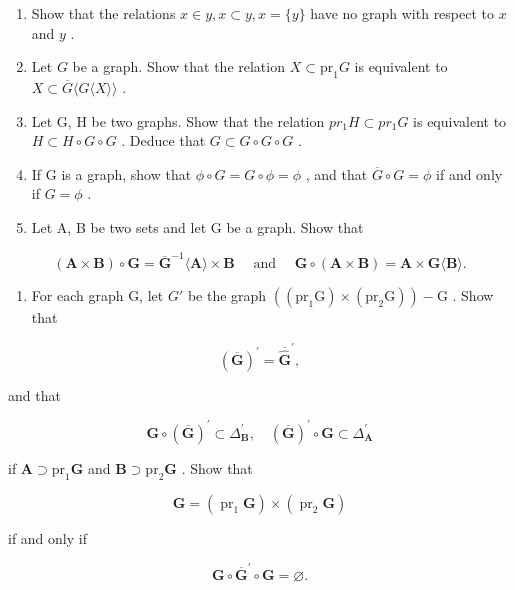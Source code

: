 \begin{enumerate}
\def\labelenumi{\arabic{enumi}.}
\item
  Show that the relations \(x \in y, x \subset y, x = \{y\}\) have no graph with respect to \(x\) and \(y\) .
\item
  Let \(G\) be a graph. Show that the relation \(X \subset \mathrm{pr}_1 G\) is equivalent to \(X \subset \overline{G} \langle G \langle X \rangle \rangle\) .
\item
  Let G, H be two graphs. Show that the relation \(pr_{1}H \subset pr_{1}G\) is equivalent to \(H \subset H \circ G \circ G\) . Deduce that \(G \subset G \circ G \circ G\) .
\item
  If G is a graph, show that \(\phi \circ G = G \circ \phi = \phi\) , and that \(\overline{G} \circ G = \phi\) if and only if \(G = \phi\) .
\item
  Let A, B be two sets and let G be a graph. Show that
\end{enumerate}

\[
(\mathbf {A} \times \mathbf {B}) \circ \mathbf {G} = \overline {{\mathbf {G}}} ^ {- 1} \langle \mathbf {A} \rangle \times \mathbf {B} \quad \text { and } \quad \mathbf {G} \circ (\mathbf {A} \times \mathbf {B}) = \mathbf {A} \times \mathbf {G} \langle \mathbf {B} \rangle .
\]

\begin{enumerate}
\def\labelenumi{\arabic{enumi}.}
\setcounter{enumi}{5}
\tightlist
\item
  For each graph G, let \(G'\) be the graph \(((\mathrm{pr}_{1}\mathrm{G}) \times (\mathrm{pr}_{2}\mathrm{G})) - \mathrm{G}\) . Show that
\end{enumerate}

\[
(\overline {{\mathbf {G}}}) ^ {\prime} = \overline {{\widehat {\mathbf {G}}}} ^ {\prime},
\]

and that

\[
\mathbf {G} \circ (\overline {{\mathbf {G}}}) ^ {\prime} \subset \Delta_ {\mathbf {B}} ^ {\prime}, \quad (\overline {{\mathbf {G}}}) ^ {\prime} \circ \mathbf {G} \subset \Delta_ {\mathbf {A}} ^ {\prime}
\]

if \(\mathbf{A} \supset \mathrm{pr}_1\mathbf{G}\) and \(\mathbf{B} \supset \mathrm{pr}_2\mathbf{G}\) . Show that

\[
\mathbf {G} = \left(\operatorname{pr} _ {1} \mathbf {G}\right) \times \left(\operatorname{pr} _ {2} \mathbf {G}\right)
\]

if and only if

\[
\mathbf {G} \circ \overline {{\mathbf {G}}} ^ {\prime} \circ \mathbf {G} = \varnothing .
\]


